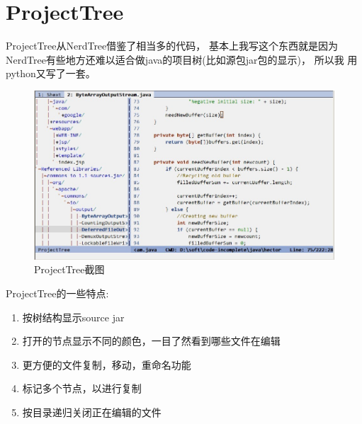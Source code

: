\documentclass[oneside,openany]{book}
\begin{document}
\section{ProjectTree}

  ProjectTree从NerdTree借鉴了相当多的代码， 基本上我写这个东西就是因为
NerdTree有些地方还难以适合做java的项目树(比如源包jar包的显示)， 所以我
用python又写了一套。

  \begin{figure}[htbp]%
  \centering
  \includegraphics[scale=0.5]{tree.jpg}
  \caption{ProjectTree截图}
  \end{figure}

  ProjectTree的一些特点:
  \begin{enumerate}
    \item 按树结构显示source jar 
    \item 打开的节点显示不同的颜色，一目了然看到哪些文件在编辑
    \item 更方便的文件复制，移动，重命名功能
    \item 标记多个节点，以进行复制
    \item 按目录递归关闭正在编辑的文件
  \end{enumerate}
\end{document}
